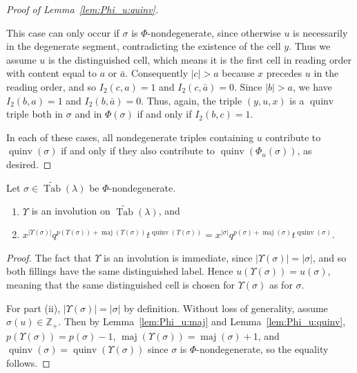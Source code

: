 \documentclass[ALCO,Unicode]{cedram}
\DeclareMathOperator{\PQT}{Tab}
\DeclareMathOperator{\maj}{maj}
\DeclareMathOperator{\quinv}{quinv}
\newcommand\cellL[4]{
\def\i{#1} \def\j{#2} \def\entry{#3} \def\labl{#4}
\draw (\j-1,-\i)--(\j,-\i)--(\j,-\i+1)--(\j-1,-\i+1)--(\j-1,-\i);
\node at (\j-.5,-\i+.5) {\entry};
\node at (\j-1.3,-\i+.8) {\tiny\labl};
}
\begin{document}
\begin{proof}[Proof of Lemma~\ref{lem:Phi_u:quinv}]
\begin{flushleft}
\end{flushleft}
This case can only occur if $\sigma$ is $\Phi$-nondegenerate, since otherwise $u$ is necessarily in the degenerate segment, contradicting the existence of the cell $y$. Thus we assume $u$ is the distinguished cell, which means it is the first cell in reading order with content equal to $a$ or $\bar{a}$. Consequently $|c|>a$ because $x$ precedes $u$ in the reading order, and so $I_2(c,a)=1$ and $I_2(c,\bar{a})=0$. Since $|b|>a$, we have $I_2(b,a)=1$ and $I_2(b,\bar{a})=0$. Thus, again, the triple $(y,u,x)$ is a $\quinv$ triple both in $\sigma$ and in $\Phi(\sigma)$ if and only if $I_2(b,c)=1$.

In each of these cases, all nondegenerate triples containing $u$ contribute to $\quinv(\sigma)$ if and only if they also contribute to $\quinv(\Phi_u(\sigma))$, as desired.
\end{proof}

\begin{corollary}\label{cor:nondegenerate}
Let $\sigma\in\widetilde{\PQT}(\lambda)$ be $\Phi$-nondegenerate.
\begin{enumerate}[label=(\roman*)]
\item $\Upsilon$ is an involution on $\widetilde{\PQT}(\lambda)$, and
\item $x^{|\Upsilon(\sigma)|} q^{p(\Upsilon(\sigma))+\maj(\Upsilon(\sigma))}t^{\quinv(\Upsilon(\sigma))} = x^{|\sigma|} q^{p(\sigma)+\maj(\sigma)}t^{\quinv(\sigma)}$.
\end{enumerate}
\end{corollary}

\begin{proof}
The fact that $\Upsilon$ is an involution is immediate, since $|\Upsilon(\sigma)|=|\sigma|$, and so both fillings have the same distinguished label. Hence $u(\Upsilon(\sigma))=u(\sigma)$, meaning that the same distinguished cell is chosen for $\Upsilon(\sigma)$ as for $\sigma$.

For part (ii), $|\Upsilon(\sigma)|=|\sigma|$ by definition. Without loss of generality, assume $\sigma(u)\in\mathbb{Z}_+$. Then by Lemma~\ref{lem:Phi_u:maj} and Lemma~\ref{lem:Phi_u:quinv},  $p(\Upsilon(\sigma))=p(\sigma)-1$, $\maj(\Upsilon(\sigma)) = \maj(\sigma)+1$, and $\quinv(\sigma)=\quinv(\Upsilon(\sigma))$ since $\sigma$ is $\Phi$-nondegenerate, so the equality follows.
\end{proof}
\end{document}
